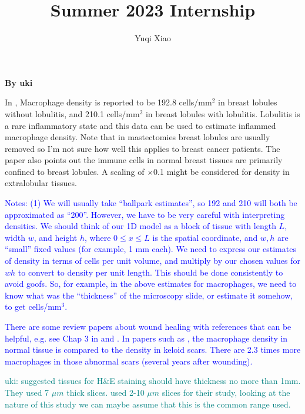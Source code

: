 \documentclass{article}
\title{Summer 2023 Internship}
\author{Yuqi Xiao}
\newcommand{\LEK}[1]{\textcolor{blue}{#1}}
\newcommand{\response}[1]{\textcolor{teal}{#1}}
\begin{document}
\maketitle

    \textbf{By uki}

    In \cite{degnim2014immune}, Macrophage density is reported to be 192.8 cells/mm$^2$ in breast lobules without lobulitis, and 210.1 cells/mm$^2$ in breast lobules with lobulitis. Lobulitis is a rare inflammatory state and this data can be used to estimate inflammed macrophage density. Note that in mastectomies breast lobules are usually removed so I'm not sure how well this applies to breast cancer patients. The paper also points out the immune cells in normal breast tissues are primarily confined to breast lobules. A scaling of $\times$0.1 might be considered for density in extralobular tissues. 

    \LEK{Notes: (1) We will usually take ``ballpark estimates'', so 192 and 210 will both be approximated as ``200''. However, we have to be very careful with interpreting densities. We should think of our 1D model as a block of tissue with length $L$, width $w$, and height $h$, where $0\le x \le L$ is the spatial coordinate, and $w,h$ are ``small'' fixed values (for example, 1 mm each). We need to express our estimates of density in terms of cells per unit volume, and multiply by our chosen values for $wh$ to convert to density per unit length. This should be done consistently to avoid goofs. So, for example, in the above estimates for macrophages, we need to know what was the ``thickness'' of the microscopy slide, or estimate it somehow, to get cells/mm$^3$.}

    \LEK{There are some review papers about wound healing with references that can be helpful, e.g. see Chap 3 in \cite{teot2020textbook} and \cite{rodrigues2019wound}. In papers such as \cite{boyce2001inflammatory}, the macrophage density in normal tissue is compared to the density in keloid scars. There are 2.3 times more macrophages in those abnormal scars (several years after wounding).}

    \response{uki: \cite{li2018hematoxylin} suggested tissues for H\&E staining should have thickness no more than 1mm. They used 7 $\mu m$ thick slices. \cite{chlipala2020optical} used 2-10 $\mu m$ slices for their study, looking at the nature of this study we can maybe assume that this is the common range used.}
    
\end{document}
